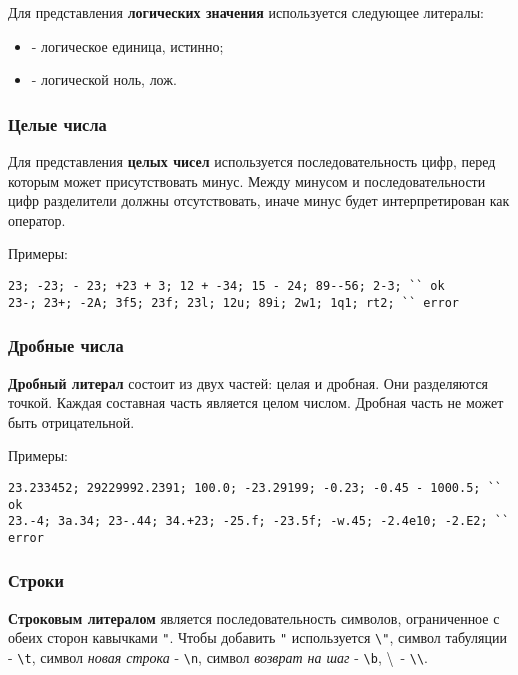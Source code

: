 \documentclass[a4paper, 14pt]{extarticle}
\newenvironment{icItems}
	{ \begin{itemize} [noitemsep,nolistsep] }
	{ \end{itemize} }
\begin{document}
Для представления {\bf логических значения} используется следующее литералы:
\begin{icItems}
	\item \true{} - логическое единица, истинно;
	\item \false{} - логической ноль, лож.
\end{icItems}

\subsubsection{Целые числа}

Для представления {\bf целых чисел} используется последовательность цифр, перед которым может присутствовать минус. Между минусом и последовательности цифр разделители должны отсутствовать, иначе минус будет интерпретирован как оператор.

\noindent Примеры:
\begin{lstlisting}[numbers=none]
23; -23; - 23; +23 + 3; 12 + -34; 15 - 24; 89--56; 2-3; `` ok
23-; 23+; -2А; 3f5; 23f; 23l; 12u; 89i; 2w1; 1q1; rt2; `` error
\end{lstlisting}

\subsubsection{Дробные числа}

{\bf Дробный литерал} состоит из двух частей: целая и дробная. Они разделяются точкой. Каждая составная часть является целом числом. Дробная часть не может быть отрицательной.

\noindent Примеры:
\begin{lstlisting}[numbers=none]
23.233452; 29229992.2391; 100.0; -23.29199; -0.23; -0.45 - 1000.5; `` ok
23.-4; 3а.34; 23-.44; 34.+23; -25.f; -23.5f; -w.45; -2.4e10; -2.E2; `` error
\end{lstlisting}

\subsubsection{Строки}

{\bf Строковым литералом} является последовательность символов, ограниченное с обеих сторон кавычками \lstinline`"`. Чтобы добавить \lstinline`"` используется \lstinline`\"`, символ табуляции - \lstinline`\t`, символ {\it новая строка} - \lstinline`\n`, символ {\it возврат на шаг} - \lstinline`\b`, \textbackslash \ - \lstinline`\\`.
\end{document}
